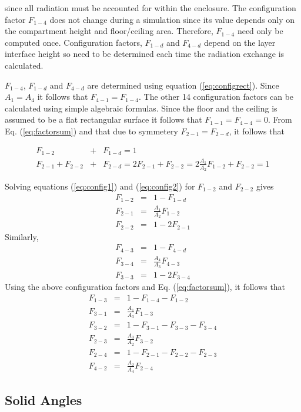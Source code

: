 \documentclass[12pt]{book}
\begin{document}
\noindent since all radiation must be accounted for within the enclosure.  The configuration factor $F_{1-4}$
does not change during a simulation since its value depends only on the compartment height and floor/ceiling area. Therefore, $F_{1-4}$ need only be computed once. Configuration
factors, $F_{1-d}$ and $F_{4-d}$ depend on the layer interface height so need to be determined each
time the radiation exchange is calculated.

$F_{1-4}$, $F_{1-d}$ and $F_{4-d}$ are determined using equation (\ref{eq:configrect}). Since $A_1 = A_4$ it follows that $F_{4-1} = F_{1-4}$. The other
14 configuration factors can be calculated using simple algebraic formulas.
Since the
floor and the ceiling is assumed to be a
flat rectangular surface it follows that $F_{1-1}=F_{4-4}=0$.
From Eq. (\ref{eq:factorsum}) and that due to symmetery
$F_{2-1}=F_{2-d}$, it follows that

\begin{eqnarray}
\label{eq:config1}
F_{1-2}&+&F_{1-d}=1\\
\label{eq:config2}
F_{2-1}+F_{2-2}&+&F_{2-d}=2F_{2-1}+F_{2-2}=2\frac{A_1}{A_2}F_{1-2}+F_{2-2}=1
\end{eqnarray}

\noindent Solving equations (\ref{eq:config1}) and (\ref{eq:config2}) for $F_{1-2}$ and $F_{2-2}$ gives
\begin{eqnarray*}
F_{1-2}&=&1-F_{1-d}\\
F_{2-1}&=&\frac{A_1}{A_2}F_{1-2}\\
F_{2-2}&=&1-2F_{2-1}
\end{eqnarray*}
Similarly,
\begin{eqnarray*}
F_{4-3}&=&1-F_{4-d}\\
F_{3-4}&=&\frac{A_4}{A_3}F_{4-3}\\
F_{3-3}&=&1-2F_{3-4}
\end{eqnarray*}
Using the above configuration factors and Eq. (\ref{eq:factorsum}), it follows that
\begin{eqnarray*}
F_{1-3}&=&1-F_{1-4} - F_{1-2}\\
F_{3-1}&=&\frac{A_1}{A_3}F_{1-3}\\
F_{3-2}&=&1-F_{3-1}-F_{3-3}-F_{3-4}\\
F_{2-3}&=&\frac{A_3}{A_2}F_{3-2}\\
F_{2-4}&=&1-F_{2-1}-F_{2-2}-F_{2-3}\\
F_{4-2}&=&\frac{A_2}{A_4}F_{2-4}
\end{eqnarray*}

\subsection{Solid Angles}
\end{document}
